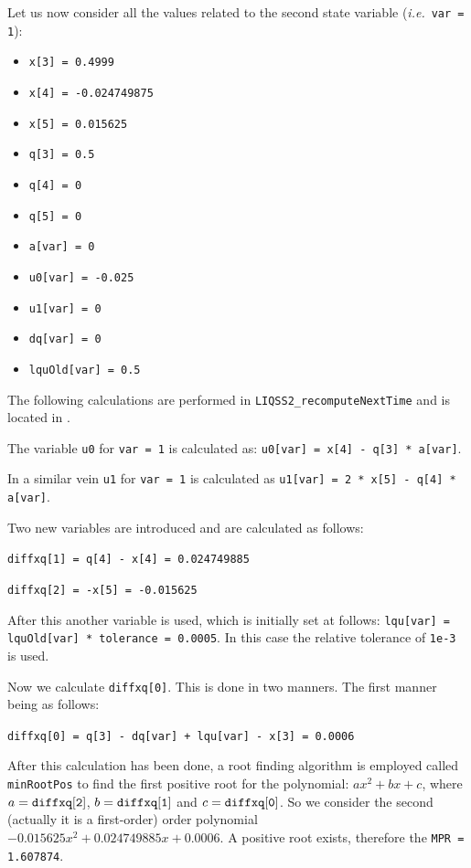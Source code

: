 \documentclass[10pt]{article}
\begin{document}
Let us now consider all the values related to the second state variable ({\em i.e.}\ {\tt{var = 1}}):
\begin{itemize}
 \item {\tt{x[3] = 0.4999}}
 \item {\tt{x[4] = -0.024749875}}
 \item {\tt{x[5] = 0.015625}}
  \item {\tt{q[3] = 0.5}}
 \item {\tt{q[4] = 0}}
 \item {\tt{q[5] = 0}}
  \item {\tt{a[var] = 0}}
  \item {\tt{u0[var] = -0.025}}
 \item {\tt{u1[var] = 0}}
 \item {\tt{dq[var] = 0}}
 \item {\tt{lquOld[var] = 0.5}}
\end{itemize}

The following calculations are performed in {\tt{LIQSS2\_recomputeNextTime}} and is located in {}.

The variable {\tt{u0}} for {\tt{var = 1}} is calculated as:  {\tt{u0[var] = x[4] - q[3] * a[var]}}.

In a similar vein {\tt{u1}} for {\tt{var = 1}} is calculated as {\tt{u1[var] = 2 * x[5] - q[4] * a[var]}}.

Two new variables are introduced and are calculated as follows:

{\tt{diffxq[1] = q[4] - x[4] = 0.024749885}}

{\tt{diffxq[2] = -x[5] = -0.015625}}

After this another variable is used, which is initially set at follows: {\tt{lqu[var] = lquOld[var] * tolerance = 0.0005}}. In this case the relative tolerance of {\tt{1e-3}} is used.

Now we calculate {\tt{diffxq[0]}}. This is done in two manners. The first manner being as follows:

{\tt{diffxq[0] = q[3] - dq[var] + lqu[var] - x[3] = 0.0006}}

After this calculation has been done, a root finding algorithm is employed called {\tt{minRootPos}} to find the first positive root for the polynomial: $ax^2 + bx +c$, where $a = {\tt{diffxq[2]}}$, $b = {\tt{diffxq[1]}}$ and $c = {\tt{diffxq[0]}}$. So we consider the second (actually it is a first-order) order polynomial $-0.015625x^2 +0.024749885x + 0.0006$. A positive root exists, therefore the {\tt{MPR = 1.607874}}.
\end{document}
